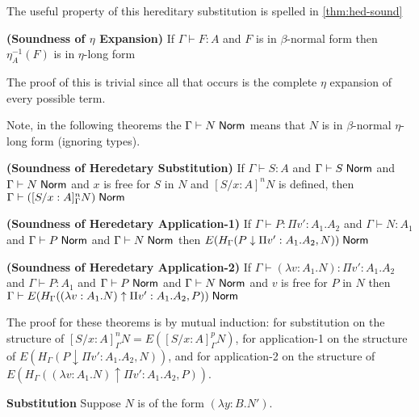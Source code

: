 The useful property of this hereditary substitution is spelled in \ref{thm:hed-sound}

\begin{theorem}
\textbf{(Soundness of $\eta$ Expansion)}
If  $\Gamma \vdash F : A$ 
and $F$ is in $\beta$-normal form then
$\eta^{-1}_{A}(F)$ is in $\eta$-long form
\label{thm:hed-long}
\end{theorem}

The proof of this is trivial since all that occurs is the complete $\eta$ expansion 
of every possible term. 

Note, in the following theorems the $\Gamma \vdash N \; \mathsf{Norm}$ means that $N $ is in $\beta$-normal 
$\eta$-long form (ignoring types).

\begin{theorem}
\textbf{(Soundness of Heredetary Substitution)}
If  $\Gamma \vdash S : A$ 
and $\Gamma \vdash S \; \mathsf{Norm}$ 
and $\Gamma \vdash N \; \mathsf{Norm}$ 
and $x$ is free for $S$ in $N$
and $[S / x : A]^n N$ is defined, 
then $\Gamma \vdash ([S / x : A]_\Gamma^n N) \; \mathsf{Norm}$ 
\label{thm:hed-sound}
\end{theorem}
\begin{theorem}
\textbf{(Soundness of Heredetary Application-1)}
If  $\Gamma \vdash P : \Pi v' : A_1 . A_2$ 
and $\Gamma \vdash N : A_1$ 
and $\Gamma \vdash P \; \mathsf{Norm}$ 
and $\Gamma \vdash N \; \mathsf{Norm}$ 
then $E(H_\Gamma(P \downarrow \Pi v' : A_1 . A_2 , N)) \; \mathsf{Norm}$ 
\label{thm:hed-app1}
\end{theorem}
\begin{theorem}
\textbf{(Soundness of Heredetary Application-2)}
If  $\Gamma \vdash (\lambda v : A_1 . N) : \Pi v' : A_1 . A_2$ 
and $\Gamma \vdash P : A_1$ 
and $\Gamma \vdash P \; \mathsf{Norm}$ 
and $\Gamma \vdash N \; \mathsf{Norm}$ 
and $v$ is free for $P$ in $N$
then $\Gamma \vdash E(H_\Gamma((\lambda v : A_1 . N) \uparrow \Pi v' : A_1 . A_2 , P)) \; \mathsf{Norm}$ 
\label{thm:hed-app2}
\end{theorem}

The proof for these theorems is by mutual induction:  
for substitution on the structure of $[S/x : A]_\Gamma^n N = E([S/x : A]_\Gamma^p N)$, 
for application-1 on the structure of $E(H_\Gamma(P \downarrow \Pi v' : A_1 . A_2 , N))$,
and for application-2 on the structure of $E(H_\Gamma((\lambda v : A_1 . N) \uparrow \Pi v' : A_1 . A_2 , P))$.


\begin{tcases}
\textbf{Substitution} Suppose $N$ is of the form $(\lambda y : B . N')$.
\end{tcases}

